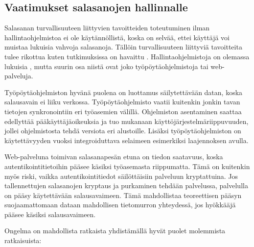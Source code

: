 \documentclass[english,gradu]{tktltiki}
\begin{document}
\subsection{Vaatimukset salasanojen hallinnalle}
           \label{sec:goals_for_pw_management}

         Salasanan turvallisuuteen liittyvien tavoitteiden toteutuminen ilman hallintaohjelmistoa ei ole käytännöllistä, koska on selvää, ettei käyttäjä voi muistaa lukuisia vahvoja salasanoja. Tällöin turvallisuuteen liittyviä tavoitteita tulee rikottua kuten tutkimuksissa on havaittu \cite{study_of_passwords_07, password_management_strategies_06}. Hallintaohjelmistoja on olemassa lukuisia \cite{dunn_password_managers_08}, mutta suurin osa niistä ovat joko työpöytäohjelmistoja tai web-palveluja.

         Työpöytäohjelmiston hyvänä puolena on luottamus säilytettävään datan, koska salausavain ei liiku verkossa. Työpöytäohjelmisto vaatii kuitenkin jonkin tavan tietojen synkronointiin eri työasemien välillä. Ohjelmiston asentaminen saattaa edellyttää pääkäyttäjäoikeuksia ja tuo mukanaan käyttöjärjestelmäriippuvuuden, jollei ohjelmistosta tehdä versiota eri alustoille. Lisäksi työpöytäohjelmiston on käytettävyyden vuoksi integroiduttava selaimeen esimerkiksi laajennoksen avulla.

         Web-palveluna toimivan salasanapesän etuna on tiedon saatavuus, koska autentikointitietoihin pääsee käsiksi työasemasta riippumatta. Tämä on kuitenkin myös riski, vaikka autentikointitiedot säilöttäisiin palveluun kryptattuina. Jos tallennettujen salasanojen kryptaus ja purkaminen tehdään palvelussa, palvelulla on pääsy käytettävään salausavaimeen. Tämä mahdollistaa teoreettisen pääsyn suojaamattomaan dataan mahdollisen tietomurron yhteydessä, jos hyökkääjä pääsee käsiksi salausavaimeen.

         Ongelma on mahdollista ratkaista yhdistämällä hyvät puolet molemmista ratkaisuista:
\end{document}

